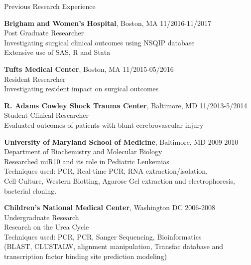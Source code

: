 \documentclass{resume} %
\begin{document}
   \begin{rSection}{Previous Research Experience}
   
   {\bf Brigham and Women’s Hospital}{, Boston, MA} \hfill {11/2016-11/2017}
   \\ 
   Post Graduate Researcher\\
   Investigating surgical clinical outcomes using NSQIP database\\
   Extensive use of SAS, R and Stata
   
   {\bf Tufts Medical Center}{, Boston, MA} \hfill {11/2015-05/2016}
   \\ 
   Resident Researcher\\
   Investigating resident impact on surgical outcomes
   
   {\bf R.  Adams Cowley Shock Trauma Center}{, Baltimore, MD} \hfill {11/2013-5/2014}
   \\ 
   Student Clinical Researcher\\
   Evaluated outcomes of patients with blunt cerebrovascular injury
   
   {\bf University of Maryland School of Medicine}{, Baltimore, MD} \hfill {2009-2010}
   \\ 
   Department of Biochemistry and Molecular Biology\\
   Researched miR10 and its role in Pediatric Leukemias\\
   Techniques used: PCR, Real-time PCR, RNA extraction/isolation,\\ Cell Culture, Western Blotting, Agarose Gel extraction and electrophoresis,\\ bacterial cloning.
   
   {\bf Children’s National Medical Center}{, Washington DC} \hfill {2006-2008}
   \\ 
   Undergraduate Research\\
   Research on the Urea Cycle\\
   Techniques used: PCR, PCR, Sanger Sequencing, Bioinformatics\\ (BLAST, CLUSTALW, alignment manipulation, Transfac database and\\ transcription factor binding site prediction modeling)
   \end{rSection}
   
\end{document}
